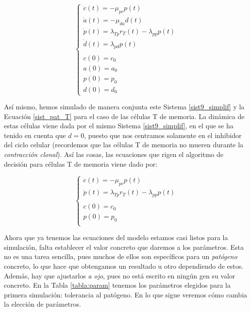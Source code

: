 \begin{equation}
	\label{sist9_simplif}
	\left\{ \begin{array}{l}
	\dot{c}(t) = -\mu_{pc}p(t) \\
	\dot{a}(t) = -\mu_{da}d(t)  \\
	\dot{p}(t) = \lambda_{Tp}r_{T}(t) - \lambda_{pp}p(t) \\
	\dot{d}(t) = \lambda_{pd}p(t) \\
	\\
	c(0)=c_0 \\
	a(0)=a_0 \\
	p(0)=p_0 \\
	d(0)=d_0 
	\end{array}
	\right.
\end{equation}

Así mismo, hemos simulado de manera conjunta este Sistema \ref{sist9_simplif} y la Ecuación \ref{sist_pat_T} para el caso de las células T de memoria. La dinámica de estas células viene dada por el mismo Sistema \ref{sist9_simplif}, en el que se ha tenido en cuenta que $d=0$, puesto que nos centramos solamente en el inhibidor del ciclo celular (recordemos que las células T de memoria no mueren durante la \textit{contracción clonal}). Así las cosas, las ecuaciones que rigen el algoritmo de decisión para células T de memoria viene dado por: 

\begin{equation}
	\label{sist15_simplif}
	\left\{ \begin{array}{l}
	\dot{c}(t) = -\mu_{pc}p(t) \\
	\dot{p}(t) = \lambda_{Tp}r_{T}(t) - \lambda_{pp}p(t) \\
	\\
	c(0)=c_0 \\
	p(0)=p_0 \\
	\end{array}
	\right.
\end{equation}

Ahora que ya tenemos las ecuaciones del modelo estamos casi listos para la simulación, falta establecer el valor concreto que daremos a los parámetros. Esta no es una tarea sencilla, pues muchos de ellos son específicos para un \textit{patógeno} concreto, lo que hace que obtengamos un resultado u otro dependiendo de estos. Además, hay que ajustarlos \textit{a ojo}, pues no está escrito en ningún gen su valor concreto. En la Tabla \ref{tabla:param} tenemos los parámetros elegidos para la primera simulación: tolerancia al patógeno. En lo que sigue veremos cómo cambia la elección de parámetros.



